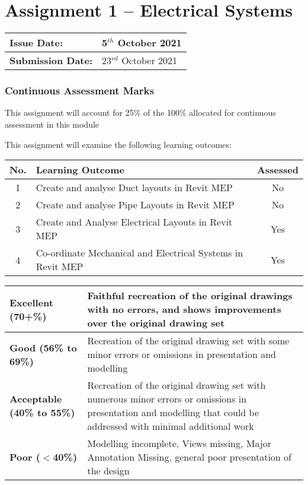 


	
\part*{Assignment 1 – Electrical Systems}

\begin{tabularx}{\textwidth}{ |X|X| }
	\hline
	\textbf{Issue Date:} & 5$^{th}$ October 2021 \\
	\hline 
	\textbf{Submission Date:}  & 23$^{rd}$ October 2021 \\
	\hline
\end{tabularx}


\section*{Continuous Assessment Marks}
This assignment will account for 25\% of the 100\% allocated for continuous assessment in this module

This assignment will examine the following learning outcomes:\\

\begin{tabularx}{\textwidth}{ |c|X|c| }
	\hline
	\textbf{No.} & \textbf{Learning Outcome} & \textbf{Assessed} \\
	\hline 
	1  & Create and analyse Duct layouts in Revit MEP & No \\
	2  & Create and analyse Pipe Layouts in Revit MEP & No \\
	3  & Create and Analyse Electrical Layouts in Revit MEP & Yes \\
	4  & Co-ordinate Mechanical and Electrical Systems in Revit MEP & Yes \\
	\hline
\end{tabularx}

\vspace{1cm}

\begin{tabularx}{\textwidth}{ |l|X| }
	\hline 
	\textbf{Excellent (70+\%)} & Faithful recreation of the original drawings with no errors, and shows improvements over the original drawing set\\ 
	\hline
	\textbf{Good (56\% to 69\%)} & Recreation of the original drawing set with some minor errors or omissions in presentation and modelling \\
	\hline
	\textbf{Acceptable (40\% to 55\%)} & Recreation of the original drawing set with numerous minor errors or omissions in presentation and modelling that could be addressed with minimal additional work \\ 
	\hline
	\textbf{Poor ($<$40\%)} & Modelling incomplete, Views missing, Major Annotation Missing, general poor presentation of the design  \\
	\hline
\end{tabularx}

